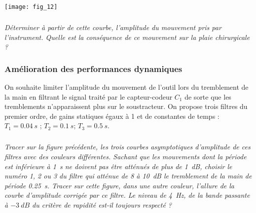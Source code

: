 \begin{multicols}{2}
\begin{center}
\texttt{[image: fig\_12]}
\end{center}

\subparagraph{}\textit{Déterminer à partir de cette courbe, l’amplitude du mouvement pris par l’instrument. Quelle est la conséquence de ce mouvement sur la plaie chirurgicale ?}
\ifprof
\begin{corrige}
\end{corrige}
\else
\fi

\subsubsection*{Amélioration des performances dynamiques}

On souhaite limiter l’amplitude du mouvement de l’outil lors du tremblement de la main en  filtrant le signal traité par le capteur-codeur $C_1$ de sorte que les tremblements n’apparaissent plus sur le soustracteur. On propose trois filtres du premier ordre, de gains statiques égaux à 1 et de constantes de temps :	 $T_1 = \SI{0,04}{s}$ ; $T_2 = \SI{0,1}{s}$; $T_3 = \SI{0,5}{s}$.



\subparagraph{}\textit{Tracer sur la figure précédente, les trois courbes asymptotiques d’amplitude de ces filtres avec des couleurs différentes. 
Sachant que les mouvements dont la période est inférieure à \SI{1}{s} ne doivent pas être atténués de plus de \SI{1}{dB}, choisir le numéro 1, 2 ou 3 du filtre qui atténue de 8 à \SI{10}{dB} le tremblement de la main de période \SI{0,25}{s}. 
Tracer sur cette figure, dans une autre couleur, l’allure de la courbe d’amplitude corrigée par ce filtre.
Le niveau de \SI{4}{Hz}, de la bande passante à $-\SI{3}{dB}$ du critère de rapidité est-il toujours respecté ? 
}
\ifprof
\begin{corrige}
\end{corrige}
\else
\fi
%
%
%

\end{multicols}
%
%
%
%
%
%

